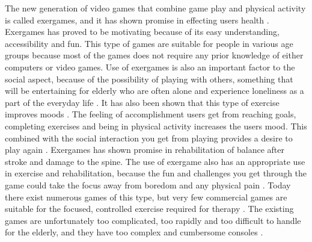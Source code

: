 The new generation of video games that combine game play and physical activity is called exergames, and it has shown promise in effecting users health \cite{promotingexercise}. Exergames has proved to be motivating because of its easy understanding, accessibility and fun. This type of games are suitable for people in various age groups because most of the games does not require any prior knowledge of either computers or video games. Use of exergames is also an important factor to the social aspect, because of the possibility of playing with others, something that will be entertaining for elderly who are often alone and experience loneliness as a part of the everyday life \cite{exergamesforelderly}. It has also been shown that this type of exercise improves moods \cite{staiano2011exergames}. The feeling of accomplishment users get from reaching goals, completing exercises and being in physical activity increases the users mood. This combined with the social interaction you get from playing provides a desire to play again \cite{exergamesforelderly} \cite{staiano2011exergames}. Exergames has shown promise in rehabilitation of balance after stroke and damage to the spine. The use of exergame also has an appropriate use in exercise and rehabilitation, because the fun and challenges you get through the game could take the focus away from boredom and any physical pain \cite{exergamesforelderly} \cite{lange2011development}. Today there exist numerous games of this type, but very few commercial games are suitable for the focused, controlled exercise required for therapy \cite{lange2011development}. The existing games are unfortunately too complicated, too rapidly and too difficult to handle for the elderly, and they have too complex and cumbersome consoles \cite{exergamesforelderly}. 

